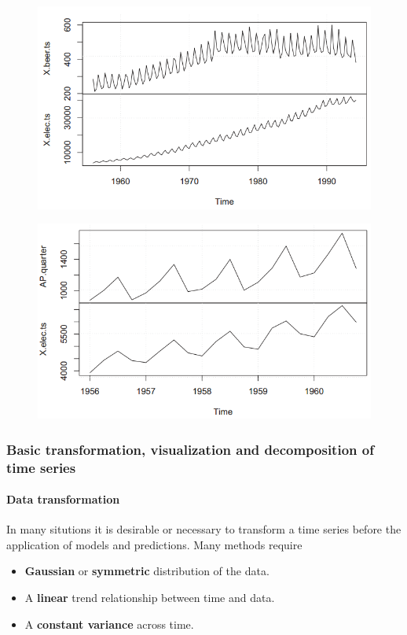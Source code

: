 			\begin{figure}[H]\centering
					\begin{minipage}[t]{.5\textwidth}
					\includegraphics[width=1\linewidth]{images/tsBeerVsElec.png}
					\label{Fig:BeerVsElectricity}
				\end{minipage}\hfill
				\begin{minipage}[t]{.5\textwidth}
					\includegraphics[width=1\linewidth]{images/tsAPVsElec.png}
					\label{Fig:APVsElectricity}
				\end{minipage}
			\end{figure}
	
	\subsubsection{Basic transformation, visualization and decomposition of time series}
		\paragraph{Data transformation}
			In many situtions it is desirable or necessary to transform a time series before the application of models and predictions. Many methods require
			\begin{itemize}
				\item \textbf{Gaussian} or \textbf{symmetric} distribution of the data.
				\item A \textbf{linear} trend relationship between time and data.
				\item A \textbf{constant variance} across time.
			\end{itemize}
			
